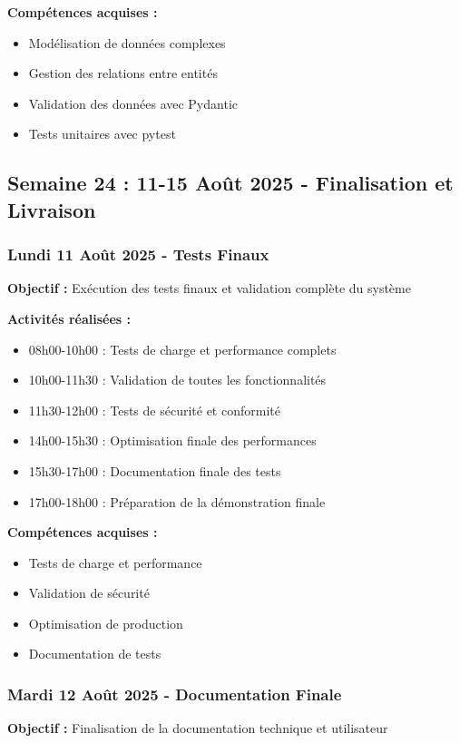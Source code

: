 \textbf{Compétences acquises :}
\begin{itemize}
    \item Modélisation de données complexes
    \item Gestion des relations entre entités
    \item Validation des données avec Pydantic
    \item Tests unitaires avec pytest
\end{itemize}


\subsection{Semaine 24 : 11-15 Août 2025 - Finalisation et Livraison}

\subsubsection{Lundi 11 Août 2025 - Tests Finaux}
\textbf{Objectif :} Exécution des tests finaux et validation complète du système

\textbf{Activités réalisées :}
\begin{itemize}
    \item 08h00-10h00 : Tests de charge et performance complets
    \item 10h00-11h30 : Validation de toutes les fonctionnalités
    \item 11h30-12h00 : Tests de sécurité et conformité
    \item 14h00-15h30 : Optimisation finale des performances
    \item 15h30-17h00 : Documentation finale des tests
    \item 17h00-18h00 : Préparation de la démonstration finale
\end{itemize}

\textbf{Compétences acquises :}
\begin{itemize}
    \item Tests de charge et performance
    \item Validation de sécurité
    \item Optimisation de production
    \item Documentation de tests
\end{itemize}

\subsubsection{Mardi 12 Août 2025 - Documentation Finale}
\textbf{Objectif :} Finalisation de la documentation technique et utilisateur

